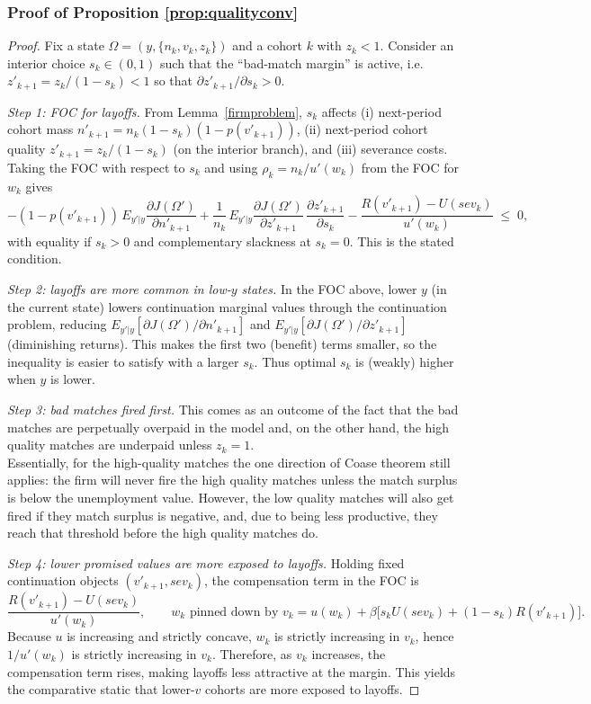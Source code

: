 \subsubsection*{Proof of Proposition \ref{prop:qualityconv}}\label{proof:qualityconv}
\begin{proof}
Fix a state $\Omega=(y,\{n_k,v_k,z_k\})$ and a cohort $k$ with $z_k<1$.
Consider an interior choice $s_k\in(0,1)$ such that the ``bad-match margin'' is active,
i.e.\ $z'_{k+1}=z_k/(1-s_k)<1$ so that $\partial z'_{k+1}/\partial s_k>0$.

\medskip
\noindent\textit{Step 1: FOC for layoffs.}
From Lemma~\ref{firmproblem}, $s_k$ affects (i) next-period cohort mass $n'_{k+1}=n_k(1-s_k)(1-p(v'_{k+1}))$,
(ii) next-period cohort quality $z'_{k+1}=z_k/(1-s_k)$ (on the interior branch), and (iii) severance costs.
Taking the FOC with respect to $s_k$ and using $\rho_k=n_k/u'(w_k)$ from the FOC for $w_k$ gives
\[
-(1-p(v'_{k+1}))\,E_{y'|y}\frac{\partial J(\Omega')}{\partial n'_{k+1}}
+\frac{1}{n_k}\,E_{y'|y}\frac{\partial J(\Omega')}{\partial z'_{k+1}}\,
\frac{\partial z'_{k+1}}{\partial s_k}
-\frac{R(v'_{k+1})-U(sev_k)}{u'(w_k)}
\;\le\;0,
\]
with equality if $s_k>0$ and complementary slackness at $s_k=0$. This is the stated condition.

\medskip
\noindent\textit{Step 2: layoffs are more common in low-$y$ states.}
In the FOC above, lower $y$ (in the current state) lowers continuation marginal values through the continuation problem,
reducing $E_{y'|y}[\partial J(\Omega')/\partial n'_{k+1}]$ and $E_{y'|y}[\partial J(\Omega')/\partial z'_{k+1}]$ (diminishing returns).
This makes the first two (benefit) terms smaller, so the inequality is easier to satisfy with a larger $s_k$.
Thus optimal $s_k$ is (weakly) higher when $y$ is lower.

\medskip
\noindent\textit{Step 3: bad matches fired first.}
This comes as an outcome of the fact that the bad matches are perpetually overpaid in the model and, on the other hand, the high quality matches are underpaid unless $z_k=1$. \\
Essentially, for the high-quality matches the one direction of Coase theorem still applies: the firm will never fire the high quality matches unless the match surplus is below the unemployment value. However, the low quality matches will also get fired if they match surplus is negative, and, due to being less productive, they reach that threshold before the high quality matches do.

\medskip
\noindent\textit{Step 4: lower promised values are more exposed to layoffs.}
Holding fixed continuation objects $(v'_{k+1},sev_k)$, the compensation term in the FOC is
\[
\frac{R(v'_{k+1})-U(sev_k)}{u'(w_k)},
\qquad
w_k \text{ pinned down by } v_k=u(w_k)+\beta\big[s_k U(sev_k)+(1-s_k)R(v'_{k+1})\big].
\]
Because $u$ is increasing and strictly concave, $w_k$ is strictly increasing in $v_k$, hence $1/u'(w_k)$ is strictly increasing in
$v_k$. Therefore, as $v_k$ increases, the compensation term rises, making layoffs less attractive at the margin. This yields the
comparative static that lower-$v$ cohorts are more exposed to layoffs.


\end{proof}
